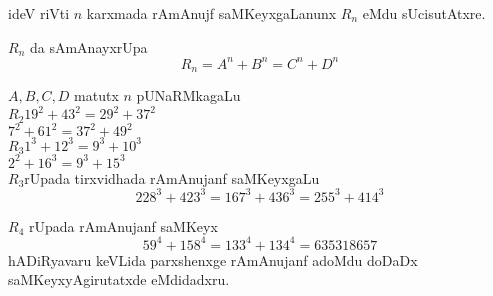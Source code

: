 ideV riVti $n$  karxmada rAmAnujf saMKeyxgaLanunx $R_n$ eMdu sUcisutAtxre.

$R_n$ da sAmAnayxrUpa
$$
R_n=A^n+B^n = C^n+D^n
$$

$A,B,C,D$ matutx $n$ pUNaRMkagaLu\\[0.02cm]

$R_2 $\;\qquad $19^2+43^2 = 29^2 + 37^2$\\
{}\qquad\qquad $7^2+61^2 = 37^2+49^2$\\[0.02cm]

$R_3$\;\quad $1^3+12^3 = 9^3+10^3$\\
\quad\qquad $2^2+16^3 = 9^3+15^3$\\[0.02cm]

$R_3$\;rUpada tirxvidhada rAmAnujanf saMKeyxgaLu
$$
 228^3+423^3 = 167^3+436^3 = 255^3+414^3
$$

$R_4$ rUpada rAmAnujanf saMKeyx
$$
59^4+158^4 =133^4+134^4 = 635318657
$$
hADiRyavaru keVLida parxshenxge rAmAnujanf adoMdu doDaDx saMKeyxyAgirutatxde eMdidadxru.

